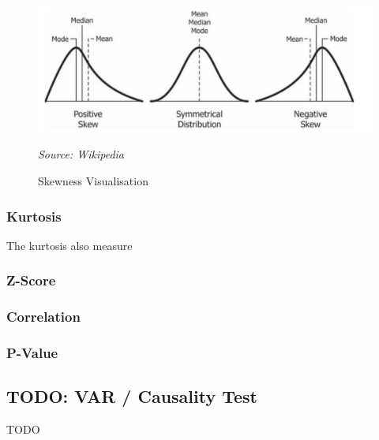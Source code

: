 \begin{figure}[h!]
      \centering
      \includegraphics[scale=0.8]{lit_review/skewness.png}
      \caption{Skewness Visualisation}
      \label{skewness fig}
      \emph{Source: Wikipedia}
\end{figure}

\subsubsection{Kurtosis}

The kurtosis also measure 
\subsubsection{Z-Score}

\subsubsection{Correlation}

\subsubsection{P-Value}

\subsection{TODO: VAR / Causality Test}
TODO
